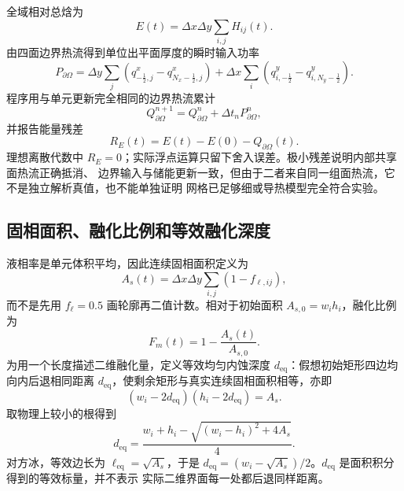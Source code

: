 \documentclass[UTF8,11pt]{ctexart}
\numberwithin{equation}{section}
\newcommand{\fl}{f_{\ell}}
\begin{document}
全域相对总焓为
\begin{equation}
      E(t)=\Delta x\Delta y\sum_{i,j}H_{ij}(t).
      \label{eq:total-enthalpy}
\end{equation}
由四面边界热流得到单位出平面厚度的瞬时输入功率
\begin{equation}
      P_{\partial\Omega}=
      \Delta y\sum_j
      \left(q^x_{-\frac12,j}-q^x_{N_x-\frac12,j}\right)
      +\Delta x\sum_i
      \left(q^y_{i,-\frac12}-q^y_{i,N_y-\frac12}\right).
      \label{eq:boundary-power}
\end{equation}
程序用与单元更新完全相同的边界热流累计
\begin{equation}
      Q_{\partial\Omega}^{n+1}
      =Q_{\partial\Omega}^{n}+\Delta t_nP_{\partial\Omega}^{n},
      \label{eq:boundary-heat}
\end{equation}
并报告能量残差
\begin{equation}
      R_E(t)=E(t)-E(0)-Q_{\partial\Omega}(t).
      \label{eq:energy-residual}
\end{equation}
理想离散代数中 $R_E=0$；实际浮点运算只留下舍入误差。极小残差说明内部共享面热流正确抵消、
边界输入与储能更新一致，但由于二者来自同一组面热流，它不是独立解析真值，也不能单独证明
网格已足够细或导热模型完全符合实验。

\subsection{固相面积、融化比例和等效融化深度}

液相率是单元体积平均，因此连续固相面积定义为
\begin{equation}
      A_s(t)=\Delta x\Delta y\sum_{i,j}(1-f_{\ell,ij}),
      \label{eq:solid-area}
\end{equation}
而不是先用 $\fl=0.5$ 画轮廓再二值计数。相对于初始面积 $A_{s,0}=w_i h_i$，融化比例为
\begin{equation}
      F_m(t)=1-\frac{A_s(t)}{A_{s,0}}.
      \label{eq:melted-fraction}
\end{equation}
为用一个长度描述二维融化量，定义等效均匀内蚀深度 $d_{\mathrm{eq}}$：假想初始矩形四边均
向内后退相同距离 $d_{\mathrm{eq}}$，使剩余矩形与真实连续固相面积相等，亦即
\begin{equation}
      (w_i-2d_{\mathrm{eq}})(h_i-2d_{\mathrm{eq}})=A_s.
      \label{eq:equivalent-depth-definition}
\end{equation}
取物理上较小的根得到
\begin{equation}
      d_{\mathrm{eq}}
      =\frac{w_i+h_i-
      \sqrt{(w_i-h_i)^2+4A_s}}{4}.
      \label{eq:equivalent-depth}
\end{equation}
对方冰，等效边长为 $\ell_{\mathrm{eq}}=\sqrt{A_s}$，于是
$d_{\mathrm{eq}}=(w_i-\sqrt{A_s})/2$。$d_{\mathrm{eq}}$ 是面积积分得到的等效标量，并不表示
实际二维界面每一处都后退同样距离。
\end{document}
